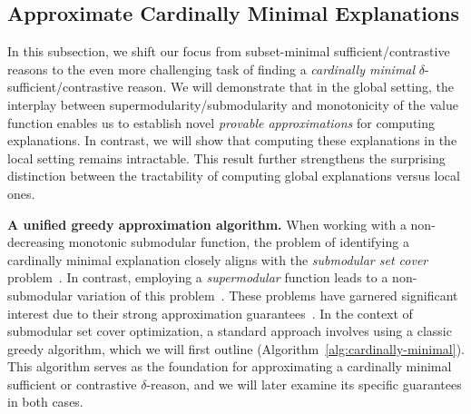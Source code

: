 \documentclass{article}
\DeclareMathOperator*{\argmax}{argmax} %
\begin{document}


\subsection{Approximate Cardinally Minimal Explanations}

In this subsection, we shift our focus from subset-minimal sufficient/contrastive reasons to the even more challenging task of finding a \emph{cardinally minimal} $\delta$-sufficient/contrastive reason. We will demonstrate that in the global setting, the interplay between supermodularity/submodularity and monotonicity of the value function enables us to establish novel \emph{provable approximations} for computing explanations. In contrast, we will show that computing these explanations in the local setting remains intractable. This result further strengthens the surprising distinction between the tractability of computing global explanations versus local ones.

\textbf{A unified greedy approximation algorithm.} When working with a non-decreasing monotonic submodular function, the problem of identifying a cardinally minimal explanation closely aligns with the \emph{submodular set cover} problem~\citep{wolsey1982analysis}. In contrast, employing a \emph{supermodular} function leads to a non-submodular variation of this problem~\citep{shi2021minimum}. These problems have garnered significant interest due to their strong approximation guarantees~\citep{wolsey1982analysis, iyer2013submodular, chen2023bicriteria}. In the context of submodular set cover optimization, a standard approach involves using a classic greedy algorithm, which we will first outline (Algorithm~\ref{alg:cardinally-minimal}). This algorithm serves as the foundation for approximating a cardinally minimal sufficient or contrastive $\delta$-reason, and we will later examine its specific guarantees in both cases.

\end{document}

